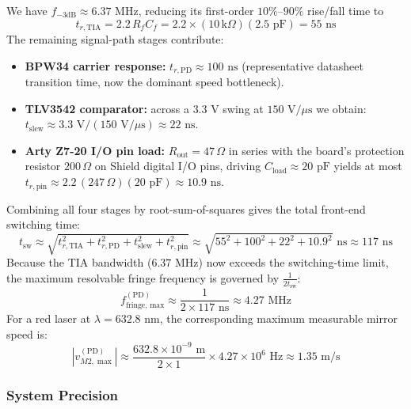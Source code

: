 We have $f_{-3\text{dB}} \approx 6.37\text{ MHz}$, reducing its first-order $10\%\text{--}90\%$ rise/fall time to
\begin{equation}
    t_{r,\text{TIA}} = 2.2\,R_f C_f = 2.2 \times (10\,\text{k}\Omega)(2.5\text{ pF}) = 55\text{ ns}
\end{equation}
The remaining signal-path stages contribute:
\begin{itemize}
    \item \textbf{BPW34 carrier response:} $t_{r,\text{PD}} \approx 100\text{ ns}$ (representative datasheet transition time, now the dominant speed bottleneck).
    \item \textbf{TLV3542 comparator:} across a $3.3\text{ V}$ swing at $150\text{ V}/\mu\text{s}$ we obtain: \\
    $t_{\text{slew}} \approx 3.3\text{ V} / (150\text{ V}/\mu\text{s}) \approx 22\text{ ns}$.
    \item \textbf{Arty Z7-20 I/O pin load:} $R_{\text{out}} = 47\,\Omega$ in series with the board's protection resistor $200\,\Omega$ on Shield digital I/O pins, driving $C_{\text{load}} \approx 20\text{ pF}$ yields at most $t_{r,\text{pin}} \approx 2.2\,(247\,\Omega)(20\text{ pF}) \approx 10.9\text{ ns}$.
\end{itemize}
Combining all four stages by root-sum-of-squares gives the total front-end switching time:
\begin{equation}
    t_{\text{sw}} \approx \sqrt{t_{r,\text{TIA}}^2 + t_{r,\text{PD}}^2 + t_{\text{slew}}^2 + t_{r,\text{pin}}^2}
    \approx \sqrt{55^2 + 100^2 + 22^2 + 10.9^2}\text{ ns} \approx 117\text{ ns}
\end{equation}
Because the TIA bandwidth ($6.37\text{ MHz}$) now exceeds the switching-time limit, the maximum resolvable fringe frequency is governed by $\frac{1}{2 t_{\text{sw}}}$:
\begin{equation}
    f_{\text{fringe, max}}^{(\text{PD})} \approx \frac{1}{2 \times 117\text{ ns}} \approx 4.27\text{ MHz}
\end{equation}
For a red laser at $\lambda = 632.8\text{ nm}$, the corresponding maximum measurable mirror speed is:
\begin{equation}
    |v_{M2, \max}^{(\text{PD})}| \approx \frac{632.8 \times 10^{-9}\text{ m}}{2 \times 1} \times 4.27 \times 10^6\text{ Hz} \approx 1.35\text{ m/s}
\end{equation}

\subsubsection{System Precision}

